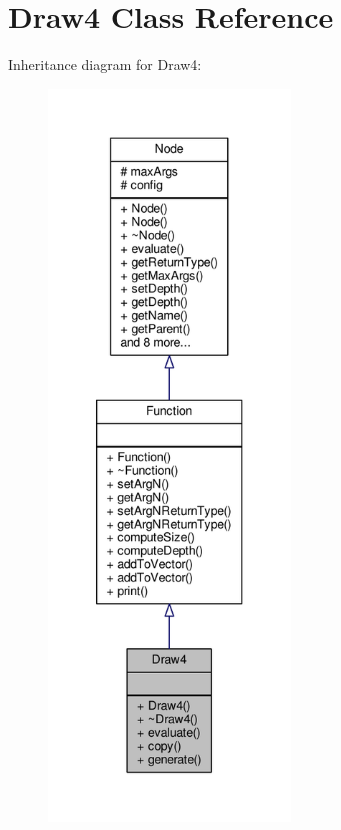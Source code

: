 \hypertarget{classDraw4}{}\section{Draw4 Class Reference}
\label{classDraw4}


Inheritance diagram for Draw4\+:
\nopagebreak
\begin{figure}[H]
\begin{center}
\leavevmode
\includegraphics[height=550pt]{classDraw4__inherit__graph}
\end{center}
\end{figure}


